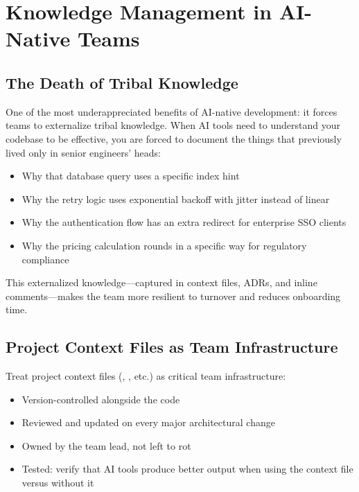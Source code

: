 \section{Knowledge Management in AI-Native Teams}

\subsection{The Death of Tribal Knowledge}

One of the most underappreciated benefits of AI-native development: it forces teams to externalize tribal knowledge. When AI tools need to understand your codebase to be effective, you are forced to document the things that previously lived only in senior engineers' heads:

\begin{itemize}[leftmargin=*]
    \item Why that database query uses a specific index hint
    \item Why the retry logic uses exponential backoff with jitter instead of linear
    \item Why the authentication flow has an extra redirect for enterprise SSO clients
    \item Why the pricing calculation rounds in a specific way for regulatory compliance
\end{itemize}

This externalized knowledge---captured in context files, ADRs, and inline comments---makes the team more resilient to turnover and reduces onboarding time.

\subsection{Project Context Files as Team Infrastructure}

Treat project context files (, , etc.) as critical team infrastructure:

\begin{itemize}[leftmargin=*]
    \item Version-controlled alongside the code
    \item Reviewed and updated on every major architectural change
    \item Owned by the team lead, not left to rot
    \item Tested: verify that AI tools produce better output when using the context file versus without it
\end{itemize}


